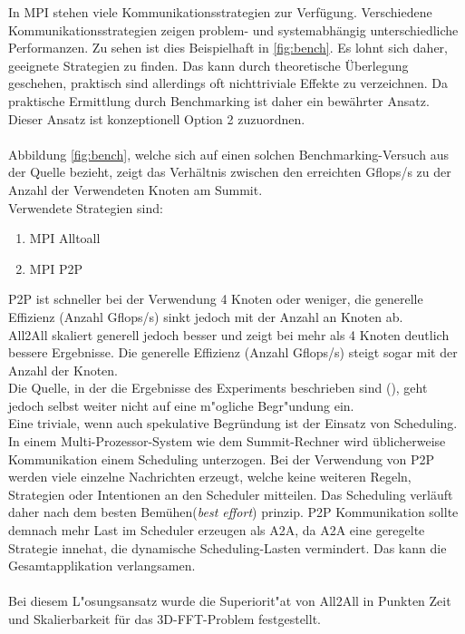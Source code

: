 In MPI stehen viele Kommunikationsstrategien zur Verfügung. Verschiedene Kommunikationsstrategien zeigen problem- und systemabhängig unterschiedliche Performanzen. Zu sehen ist dies Beispielhaft in \ref{fig:bench}.
Es lohnt sich daher, geeignete Strategien zu finden. Das kann durch theoretische Überlegung geschehen, praktisch sind allerdings oft nichttriviale Effekte zu verzeichnen. Da praktische Ermittlung durch Benchmarking ist daher ein bewährter Ansatz.\\
Dieser Ansatz ist konzeptionell Option 2 zuzuordnen.\\
\\
Abbildung \ref{fig:bench}, welche sich auf einen solchen Benchmarking-Versuch aus der Quelle \cite{mainpaper} bezieht, zeigt das Verhältnis zwischen den erreichten Gflops/s zu der Anzahl der Verwendeten Knoten am Summit.\\
Verwendete Strategien sind:
\begin{enumerate}
	\item MPI Alltoall
	\item MPI P2P
\end{enumerate}
P2P ist schneller bei der Verwendung 4 Knoten oder weniger, die generelle Effizienz (Anzahl Gflops/s) sinkt jedoch mit der Anzahl an Knoten ab.\\
All2All skaliert generell jedoch besser und zeigt bei mehr als 4 Knoten deutlich bessere Ergebnisse. Die generelle Effizienz (Anzahl Gflops/s) steigt sogar mit der Anzahl der Knoten.\\
Die Quelle, in der die Ergebnisse des Experiments beschrieben sind (\cite{mainpaper}), geht jedoch selbst weiter nicht auf eine m"ogliche Begr"undung ein.\\
Eine triviale, wenn auch spekulative Begründung ist der Einsatz von Scheduling. In einem Multi-Prozessor-System wie dem Summit-Rechner wird üblicherweise Kommunikation einem Scheduling unterzogen. Bei der Verwendung von P2P werden viele einzelne Nachrichten erzeugt, welche keine weiteren Regeln, Strategien oder Intentionen an den Scheduler mitteilen. Das Scheduling verläuft daher nach dem \glqq besten Bemühen\grqq(\textit{best effort}) prinzip. P2P Kommunikation sollte demnach mehr Last im Scheduler erzeugen als A2A, da A2A eine geregelte Strategie innehat, die dynamische Scheduling-Lasten vermindert. Das kann die Gesamtapplikation verlangsamen.\\
\\
Bei diesem L"osungsansatz wurde die Superiorit"at von All2All in Punkten Zeit und Skalierbarkeit für das 3D-FFT-Problem festgestellt.\\
